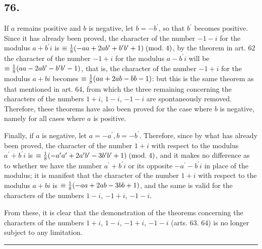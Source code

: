 \documentclass[twoside,12pt, showframe]{memoir}
\renewcommand{\pmod}[1]{\;(\textrm{mod.}\;#1)}
\let\oldfrac\frac
\def\frac#1#2{\mathchoice{\tfrac{#1}{#2}}{\oldfrac{#1}{#2}}{\genfrac{}{}{}{2}{#1}{#2\mathstrut}}{\genfrac{}{}{}{3}{#1}{#2\mathstrut}}}
\begin{document}
\subsection*{76.}

If \(a\) remains positive and \(b\) is negative, let \(b=-b^{\prime}\), so that \(b^{\prime}\) becomes positive. Since it has already been proved, the character of the number \(-1-i\) for the modulus \(a+b^{\prime} i\) is \(\equiv \frac{1}{8}(-a a+2 a b^{\prime}+b^{\prime} b^{\prime}+1)\pmod{4}\), by the theorem in art. 62 the character of the number \(-1+i\) for the modulus \(a-b^{\prime} i\) will be \(\equiv \frac{1}{8}(a a-2 a b^{\prime}-b^{\prime} b^{\prime}-1)\), that is, the character of the number \(-1+i\) for the modulus \(a+b i\) becomes \(\equiv \frac{1}{8}(a a+2 a b-b b-1)\): but this is the same theorem as that mentioned in art. 64, from which the three remaining concerning the characters of the numbers \(1+i\), \(1-i\), \(-1-i\) are spontaneously removed. Therefore, these theorems have also been proved for the case where \(b\) is negative, namely for all cases where \(a\) is positive.

Finally, if \(a\) is negative, let \(a=-a^{\prime}, b=-b^{\prime}\). Therefore, since by what has already been proved, the character of the number \(1+i\) with respect to the modulus \(a^{\prime}+b^{\prime} i\) is \(\equiv \frac{1}{8}(-a^{\prime} a^{\prime}+2 a^{\prime} b^{\prime}-3 b^{\prime} b^{\prime}+1)\pmod{4}\), and it makes no difference as to whether we have the number \(a^{\prime}+b^{\prime} i\) or its opposite \(-a^{\prime}-b^{\prime} i\) in place of the modulus; it is manifest that the character of the number \(1+i\) with respect to the modulus \(a+b i\) is \(\equiv \frac{1}{8}(-a a+2 a b-3 b b+1)\), and the same is valid for the characters of the numbers \(1-i\), \(-1+i\), \(-1-i\).

From these, it is clear that the demonstration of the theorems concerning the characters of the numbers \(1+i\), \(1-i\), \(-1+i\), \(-1-i\) (arts. 63. 64) is no longer subject to any limitation.

\begin{center}\rule{1.5in}{0.5pt}\end{center}
\end{document}
